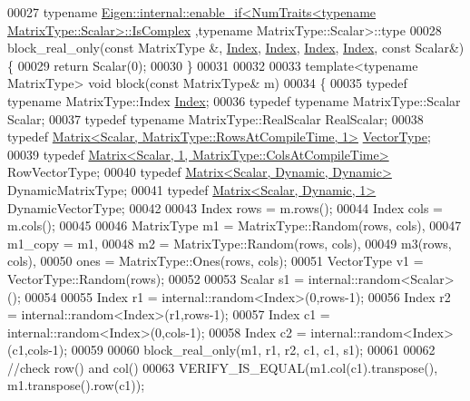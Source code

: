 \begin{DoxyCode}
00027 \textcolor{keyword}{typename} 
      \hyperlink{struct_eigen_1_1internal_1_1enable__if}{Eigen::internal::enable\_if<NumTraits<typename MatrixType::Scalar>::IsComplex}
      ,\textcolor{keyword}{typename} MatrixType::Scalar>::type
00028 block\_real\_only(\textcolor{keyword}{const} MatrixType &, \hyperlink{namespace_eigen_a62e77e0933482dafde8fe197d9a2cfde}{Index}, \hyperlink{namespace_eigen_a62e77e0933482dafde8fe197d9a2cfde}{Index}, \hyperlink{namespace_eigen_a62e77e0933482dafde8fe197d9a2cfde}{Index}, \hyperlink{namespace_eigen_a62e77e0933482dafde8fe197d9a2cfde}{Index}, \textcolor{keyword}{const} Scalar&) \{
00029   \textcolor{keywordflow}{return} Scalar(0);
00030 \}
00031 
00032 
00033 \textcolor{keyword}{template}<\textcolor{keyword}{typename} MatrixType> \textcolor{keywordtype}{void} block(\textcolor{keyword}{const} MatrixType& m)
00034 \{
00035   \textcolor{keyword}{typedef} \textcolor{keyword}{typename} MatrixType::Index \hyperlink{namespace_eigen_a62e77e0933482dafde8fe197d9a2cfde}{Index};
00036   \textcolor{keyword}{typedef} \textcolor{keyword}{typename} MatrixType::Scalar Scalar;
00037   \textcolor{keyword}{typedef} \textcolor{keyword}{typename} MatrixType::RealScalar RealScalar;
00038   \textcolor{keyword}{typedef} \hyperlink{group___core___module_class_eigen_1_1_matrix}{Matrix<Scalar, MatrixType::RowsAtCompileTime, 1>} 
      \hyperlink{struct_vector_type}{VectorType};
00039   \textcolor{keyword}{typedef} \hyperlink{group___core___module_class_eigen_1_1_matrix}{Matrix<Scalar, 1, MatrixType::ColsAtCompileTime>} 
      RowVectorType;
00040   \textcolor{keyword}{typedef} \hyperlink{group___core___module}{Matrix<Scalar, Dynamic, Dynamic>} DynamicMatrixType;
00041   \textcolor{keyword}{typedef} \hyperlink{group___core___module}{Matrix<Scalar, Dynamic, 1>} DynamicVectorType;
00042   
00043   Index rows = m.rows();
00044   Index cols = m.cols();
00045 
00046   MatrixType m1 = MatrixType::Random(rows, cols),
00047              m1\_copy = m1,
00048              m2 = MatrixType::Random(rows, cols),
00049              m3(rows, cols),
00050              ones = MatrixType::Ones(rows, cols);
00051   VectorType v1 = VectorType::Random(rows);
00052 
00053   Scalar s1 = internal::random<Scalar>();
00054 
00055   Index r1 = internal::random<Index>(0,rows-1);
00056   Index r2 = internal::random<Index>(r1,rows-1);
00057   Index c1 = internal::random<Index>(0,cols-1);
00058   Index c2 = internal::random<Index>(c1,cols-1);
00059 
00060   block\_real\_only(m1, r1, r2, c1, c1, s1);
00061 
00062   \textcolor{comment}{//check row() and col()}
00063   VERIFY\_IS\_EQUAL(m1.col(c1).transpose(), m1.transpose().row(c1));

\end{DoxyCode}
